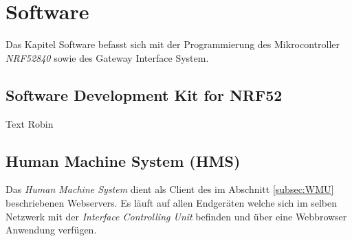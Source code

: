 \clearpage
\section{Software}\label{sec:Software}
Das Kapitel Software befasst sich mit der Programmierung des Mikrocontroller \textit{NRF52840} sowie des Gateway Interface System.

\subsection{Software Development Kit for NRF52}\label{subsec:SDK}
Text Robin

\subsection{Human Machine System (HMS)}\label{subsec:HMS_SW}
Das \textit{Human Machine System} dient als Client des im Abschnitt \ref{subsec:WMU} beschriebenen Webservers. Es läuft auf allen Endgeräten welche sich im selben Netzwerk mit der \textit{Interface Controlling Unit} befinden und über eine Webbrowser Anwendung verfügen. 